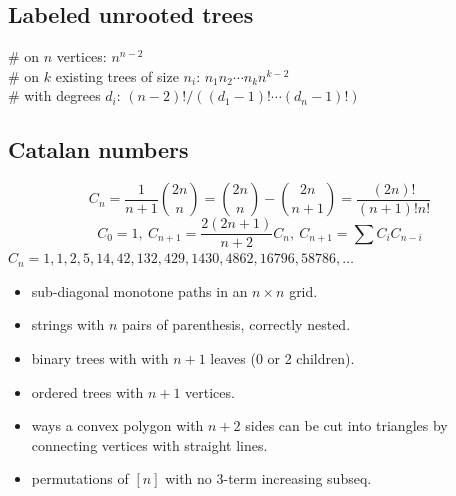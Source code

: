 	\subsection{Labeled unrooted trees}
		\# on $n$ vertices: $n^{n-2}$ \\
		\# on $k$ existing trees of size $n_i$: $n_1n_2\cdots n_k n^{k-2}$ \\
		\# with degrees $d_i$: $(n-2)! / ((d_1-1)! \cdots (d_n-1)!)$

	\subsection{Catalan numbers}
		\[ C_n=\frac{1}{n+1}\binom{2n}{n}= \binom{2n}{n}-\binom{2n}{n+1} = \frac{(2n)!}{(n+1)!n!} \]
		\[ C_0=1,\ C_{n+1} = \frac{2(2n+1)}{n+2}C_n,\ C_{n+1}=\sum C_iC_{n-i} \]
		${C_n = 1, 1, 2, 5, 14, 42, 132, 429, 1430, 4862, 16796, 58786, \dots}$
		\begin{itemize}[noitemsep]
			\item sub-diagonal monotone paths in an $n\times n$ grid.
			\item strings with $n$ pairs of parenthesis, correctly nested.
			\item binary trees with with $n+1$ leaves (0 or 2 children).
			\item ordered trees with $n+1$ vertices.
			\item ways a convex polygon with $n+2$ sides can be cut into triangles by connecting vertices with straight lines.
			\item permutations of $[n]$ with no 3-term increasing subseq.
		\end{itemize}

\columnbreak